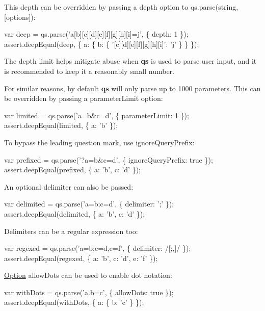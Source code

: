 This depth can be overridden by passing a {\ttfamily depth} option to {\ttfamily qs.\+parse(string, \mbox{[}options\mbox{]})}\+:


\begin{DoxyCode}
var deep = qs.parse('a[b][c][d][e][f][g][h][i]=j', \{ depth: 1 \});
assert.deepEqual(deep, \{ a: \{ b: \{ '[c][d][e][f][g][h][i]': 'j' \} \} \});
\end{DoxyCode}


The depth limit helps mitigate abuse when {\bfseries qs} is used to parse user input, and it is recommended to keep it a reasonably small number.

For similar reasons, by default {\bfseries qs} will only parse up to 1000 parameters. This can be overridden by passing a {\ttfamily parameter\+Limit} option\+:


\begin{DoxyCode}
var limited = qs.parse('a=b&c=d', \{ parameterLimit: 1 \});
assert.deepEqual(limited, \{ a: 'b' \});
\end{DoxyCode}


To bypass the leading question mark, use {\ttfamily ignore\+Query\+Prefix}\+:


\begin{DoxyCode}
var prefixed = qs.parse('?a=b&c=d', \{ ignoreQueryPrefix: true \});
assert.deepEqual(prefixed, \{ a: 'b', c: 'd' \});
\end{DoxyCode}


An optional delimiter can also be passed\+:


\begin{DoxyCode}
var delimited = qs.parse('a=b;c=d', \{ delimiter: ';' \});
assert.deepEqual(delimited, \{ a: 'b', c: 'd' \});
\end{DoxyCode}


Delimiters can be a regular expression too\+:


\begin{DoxyCode}
var regexed = qs.parse('a=b;c=d,e=f', \{ delimiter: /[;,]/ \});
assert.deepEqual(regexed, \{ a: 'b', c: 'd', e: 'f' \});
\end{DoxyCode}


\mbox{\hyperlink{structOption}{Option}} {\ttfamily allow\+Dots} can be used to enable dot notation\+:


\begin{DoxyCode}
var withDots = qs.parse('a.b=c', \{ allowDots: true \});
assert.deepEqual(withDots, \{ a: \{ b: 'c' \} \});
\end{DoxyCode}


